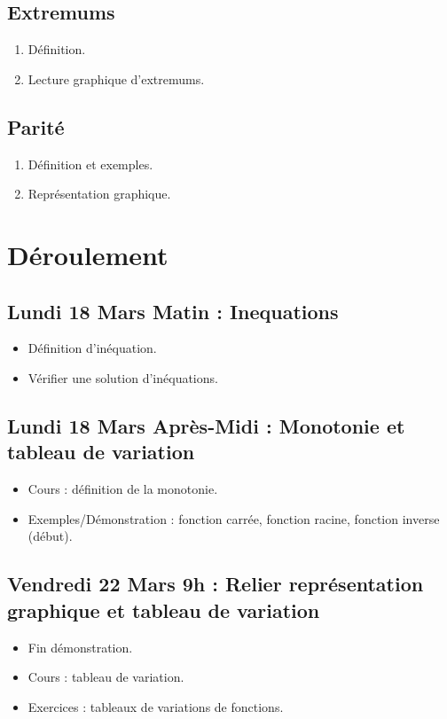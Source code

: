 \documentclass{article}
\begin{document}
\subsection{Extremums}
\begin{enumerate}
\item Définition.
\item Lecture graphique d'extremums. 
\end{enumerate}
\subsection{Parité}
\begin{enumerate}
\item Définition et exemples.
\item Représentation graphique.
\end{enumerate}
\section{Déroulement}
\subsection*{Lundi 18 Mars Matin : Inequations}
\begin{itemize}
\item Définition d'inéquation.
\item Vérifier une solution d'inéquations.
\end{itemize}
\subsection*{Lundi 18 Mars Après-Midi : Monotonie et tableau de variation}
\begin{itemize}
\item Cours : définition de la monotonie.
\item Exemples/Démonstration : fonction carrée, fonction racine, fonction inverse (début).
\end{itemize}
\subsection*{Vendredi 22 Mars 9h : Relier représentation graphique et tableau de variation}
\begin{itemize}
\item Fin démonstration.
\item Cours : tableau de variation.
\item Exercices : tableaux de variations de fonctions.
\end{itemize}
\end{document}
